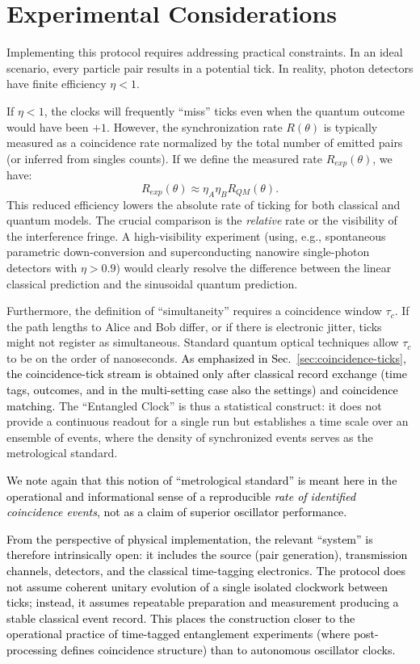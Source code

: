 \documentclass[reprint,aps,pra,longbibliography]{revtex4-2}
\newcommand{\rev}[1]{\textcolor{black}{#1}} %
\newcommand{\revG}[1]{\textcolor{black}{#1}} %
\begin{document}
\section{Experimental Considerations}

Implementing this protocol requires addressing practical constraints. In an ideal scenario, every particle pair results in a potential tick. In reality, photon detectors have finite efficiency $\eta < 1$.

If $\eta < 1$, the clocks will frequently ``miss'' ticks even when the quantum outcome would have been $+1$. However, the synchronization rate $R(\theta)$ is typically measured as a coincidence rate normalized by the total number of emitted pairs (or inferred from singles counts). If we define the measured rate $R_{exp}(\theta)$, we have:
\begin{equation}
R_{exp}(\theta) \approx \eta_A \eta_B R_{QM}(\theta).
\end{equation}
This reduced efficiency lowers the absolute rate of ticking for both classical and quantum models. The crucial comparison is the \emph{relative} rate or the visibility of the interference fringe. A high-visibility experiment (using, e.g., spontaneous parametric down-conversion and superconducting nanowire single-photon detectors with $\eta > 0.9$) would clearly resolve the difference between the linear classical prediction and the sinusoidal quantum prediction.

Furthermore, the definition of ``simultaneity'' requires a coincidence window $\tau_c$. If the path lengths to Alice and Bob differ, or if there is electronic jitter, ticks might not register as simultaneous. Standard quantum optical techniques allow $\tau_c$ to be on the order of nanoseconds. \rev{As emphasized in Sec.~\ref{sec:coincidence-ticks}, the coincidence-tick stream is obtained only after classical record exchange (time tags, outcomes, and in the multi-setting case also the settings) and coincidence matching.} The ``Entangled Clock'' is thus a statistical construct: it does not provide a continuous readout for a single run but establishes a time scale over an ensemble of events, where the density of synchronized events serves as the metrological standard.

\rev{We note again that this notion of ``metrological standard'' is meant here in the operational and informational sense of a reproducible \emph{rate of identified coincidence events}, not as a claim of superior oscillator performance.}

\revG{From the perspective of physical implementation, the relevant ``system'' is therefore intrinsically open: it includes the source (pair generation), transmission channels, detectors, and the classical time-tagging electronics. The protocol does not assume coherent unitary evolution of a single isolated clockwork between ticks; instead, it assumes repeatable preparation and measurement producing a stable classical event record. This places the construction closer to the operational practice of time-tagged entanglement experiments (where post-processing defines coincidence structure) than to autonomous oscillator clocks.}
\end{document}
